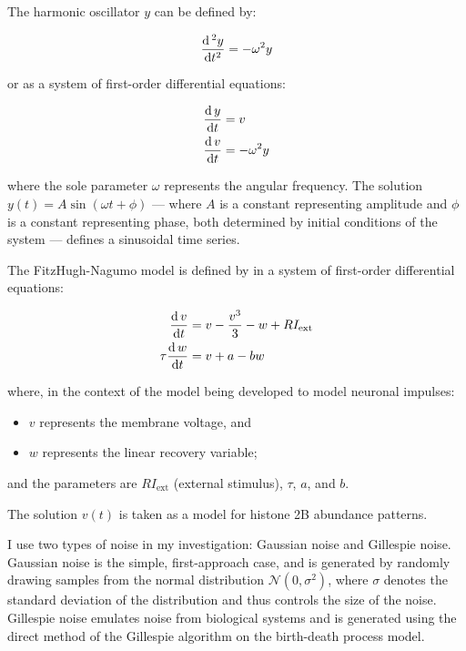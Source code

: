 The harmonic oscillator $y$ can be defined by:

\begin{equation}
  \frac{\mathrm{d} \,^{2} y}{\mathrm{d} t^{2}} = -\omega^{2}y
  \label{eq:harmonic}
\end{equation}

or as a system of first-order differential equations:

\begin{equation}
  \begin{aligned}
    \frac{\mathrm{d} \, y}{\mathrm{d} t} &= v \\
    \frac{\mathrm{d} \, v}{\mathrm{d} t} &= -\omega^{2}y
  \end{aligned}
  \label{eq:harmonic-1o}
\end{equation}

where the sole parameter $\omega$ represents the angular frequency.
The solution $y(t) = A \sin(\omega{}t + \phi)$ --- where $A$ is a constant representing amplitude and $\phi$ is a constant representing phase, both determined by initial conditions of the system --- defines a sinusoidal time series.

The FitzHugh-Nagumo model is defined by in a system of first-order differential equations:

\begin{equation}
  \begin{aligned}
    \frac{\mathrm{d} \, v}{\mathrm{d} t} &= v - \frac{v^3}{3} - w + RI_{\mathrm{ext}} \\
    \tau \frac{\mathrm{d} \, w}{\mathrm{d} t} &= v + a - bw
  \end{aligned}
  \label{eq:fhn}
\end{equation}

where, in the context of the model being developed to model neuronal impulses:
\begin{itemize}
  \item $v$ represents the membrane voltage, and
  \item $w$ represents the linear recovery variable;
\end{itemize}

and the parameters are $RI_{\mathrm{ext}}$ (external stimulus), $\tau$, $a$, and $b$.

The solution $v(t)$ is taken as a model for histone 2B abundance patterns.

I use two types of noise in my investigation: Gaussian noise and Gillespie noise.
Gaussian noise is the simple, first-approach case, and is generated by randomly drawing samples from the normal distribution $\mathcal{N}(0,\sigma^{2})$, where $\sigma$ denotes the standard deviation of the distribution and thus controls the size of the noise.
Gillespie noise emulates noise from biological systems and is generated using the direct method of the Gillespie algorithm \parencite{gillespieExactStochasticSimulation1977} on the birth-death process model.

